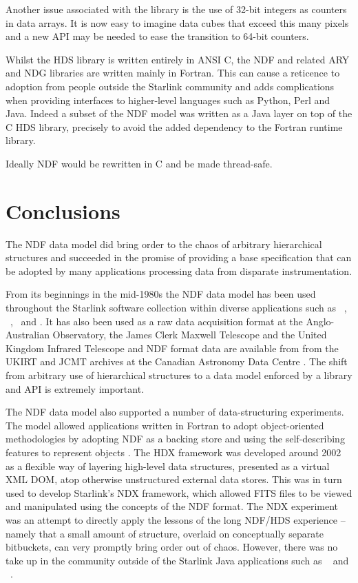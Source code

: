 \documentclass[final,authoryear,5p,times,twocolumn]{elsarticle}
\begin{document}
Another issue associated with the library is the use of 32-bit
integers as counters in data arrays. It is now easy to imagine data
cubes that exceed this many pixels and a new API may be needed to ease
the transition to 64-bit counters.

Whilst the HDS library is written entirely in ANSI C, the NDF and
related ARY \citep{SUN11} and NDG \citep{SUN2} libraries are written
mainly in Fortran.
This can cause a reticence to adoption from people outside the Starlink community and
adds complications when providing interfaces to higher-level languages
such as Python, Perl and Java. Indeed a subset of the NDF model  was
written as a Java layer on top of the C HDS library, precisely to
avoid the added dependency to the Fortran runtime library.

Ideally NDF would be rewritten in C and be made thread-safe.

\section{Conclusions}
\label{sec:conclusion}

The NDF data model did bring order to the chaos of arbitrary
hierarchical structures and succeeded in the
promise of providing a base specification that can be adopted by many
applications processing data from disparate instrumentation.

From its beginnings in the mid-1980s the NDF data model has been used
throughout the Starlink software collection within diverse
applications such as \smurf\ \citep{2013MNRAS.430.2545C},
\ccdpack\ \citep{1993ESOC...47...39W,SUN139}, \gaia\ and \KAPPA.
It has also been used as a raw data acquisition format at the
Anglo-Australian Observatory, the James Clerk Maxwell Telescope and the United Kingdom Infrared
Telescope and NDF format data are available from
from the UKIRT and JCMT archives at the Canadian Astronomy Data Centre
\citep{2008ASPC..394..450E,P01_adassxxiii}. The shift from arbitrary
use of hierarchical structures to a data model enforced by a library
and API is extremely important.

The NDF data model also supported a number of data-structuring
experiments.
The model allowed applications written in Fortran to
adopt object-oriented methodologies by adopting NDF as a backing store
and using the self-describing features to represent objects
\citep{1993ASPC...52..199B}.
The HDX framework \citep{2003ASPC..295..221G} was developed around 2002 as a flexible
way of layering high-level data structures, presented as a virtual XML
DOM, atop otherwise unstructured external data stores.  This was in
turn used to develop Starlink's NDX framework,\label{sec:ndx} which allowed FITS
files to be viewed and manipulated using the concepts of the NDF
format.  The NDX experiment was an attempt to directly apply the
lessons of the long NDF/HDS experience -- namely that a small amount of
structure, overlaid on conceptually separate bitbuckets, can very
promptly bring order out of chaos.
However, there was no take up in the community outside of the Starlink Java applications
such as \treeview\ \citep{2003ASPC..295..445B} and
\splat\ \citep[][]{2005ASPC..347...22D}.
\end{document}
